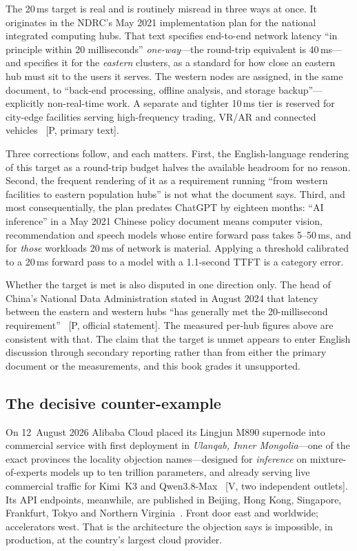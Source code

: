 The 20\,ms target is real and is routinely misread in three ways at once. It originates in the NDRC's May 2021 implementation plan for the national integrated computing hubs. That text specifies end-to-end network latency ``in principle within 20 milliseconds'' \emph{one-way}---the round-trip equivalent is 40\,ms---and specifies it for the \emph{eastern} clusters, as a standard for how close an eastern hub must sit to the users it serves. The western nodes are assigned, in the same document, to ``back-end processing, offline analysis, and storage backup''---explicitly non-real-time work. A separate and tighter 10\,ms tier is reserved for city-edge facilities serving high-frequency trading, VR/AR and connected vehicles~\cite{ndrc-2021} [P, primary text].

Three corrections follow, and each matters. First, the English-language rendering of this target as a round-trip budget halves the available headroom for no reason. Second, the frequent rendering of it as a requirement running ``from western facilities to eastern population hubs'' is not what the document says. Third, and most consequentially, the plan predates ChatGPT by eighteen months: ``AI inference'' in a May 2021 Chinese policy document means computer vision, recommendation and speech models whose entire forward pass takes 5--50\,ms, and for \emph{those} workloads 20\,ms of network is material. Applying a threshold calibrated to a 20\,ms forward pass to a model with a 1.1-second TTFT is a category error.

Whether the target is met is also disputed in one direction only. The head of China's National Data Administration stated in August 2024 that latency between the eastern and western hubs ``has generally met the 20-millisecond requirement''~\cite{nda-latency} [P, official statement]. The measured per-hub figures above are consistent with that. The claim that the target is unmet appears to enter English discussion through secondary reporting rather than from either the primary document or the measurements, and this book grades it unsupported.

\subsection{The decisive counter-example}
\label{sec:locality-counter}

On 12~August 2026 Alibaba Cloud placed its Lingjun M890 supernode into commercial service with first deployment in \emph{Ulanqab, Inner Mongolia}---one of the exact provinces the locality objection names---designed for \emph{inference} on mixture-of-experts models up to ten trillion parameters, and already serving live commercial traffic for Kimi~K3 and Qwen3.8-Max~\cite{m890-ulanqab} [V, two independent outlets]. Its API endpoints, meanwhile, are published in Beijing, Hong Kong, Singapore, Frankfurt, Tokyo and Northern Virginia~\cite{alibaba-endpoints}. Front door east and worldwide; accelerators west. That is the architecture the objection says is impossible, in production, at the country's largest cloud provider.

